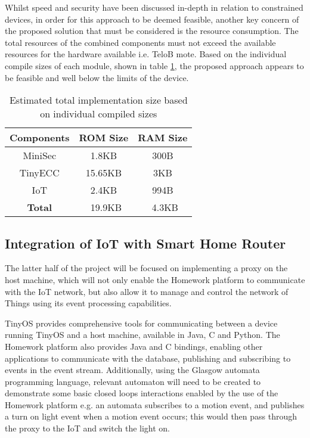 \documentclass{mprop}
\begin{document}
Whilst speed and security have been discussed in-depth in relation to constrained devices, in order for this approach to be deemed feasible, another key concern of the proposed solution that must be considered is the resource consumption. The total resources of the combined components must not exceed the available resources for the hardware available i.e. TeloB mote. Based on the individual compile sizes of each module, shown in table \ref{tab:compile_sizes}, the proposed approach appears to be feasible and well below the limits of the device.
\begin{table}[h] %
  \begin{center} 
  \begin{tabular}{|c|c|c|} 
  \hline
  \textbf{Components} & \textbf{ROM Size}  & \textbf{RAM Size}\\  \hline
  MiniSec             & 1.8KB              & 300B \\     \hline
  TinyECC             & 15.65KB            & 3KB\\       \hline
  IoT                 & 2.4KB              & 994B\\      \hline 
  \textbf{Total}      & ~19.9KB            & ~4.3KB\\    \hline
  \end{tabular}
  \caption[]{Estimated total implementation size based on individual compiled sizes}
  \label{tab:compile_sizes}
  \end{center}
\end{table}


\subsection{Integration of IoT with Smart Home Router} %
\label{sub:implementation_of_iot_on_smart_home_router}
The latter half of the project will be focused on implementing a proxy on the host machine, which will not only enable the Homework platform to communicate with the IoT network, but also allow it to manage and control the network of Things using its event processing capabilities. 

TinyOS provides comprehensive tools for communicating between a device running TinyOS and a host machine, available in Java, C and Python. The Homework platform also provides Java and C bindings, enabling other applications to communicate with the database, publishing and subscribing to events in the event stream. Additionally, using the Glasgow automata programming language, relevant automaton will need to be created to demonstrate some basic closed loops interactions enabled by the use of the Homework platform e.g. an automata subscribes to a motion event, and publishes a turn on light event when a motion event occurs; this would then pass through the proxy to the IoT and switch the light on.
\end{document}

